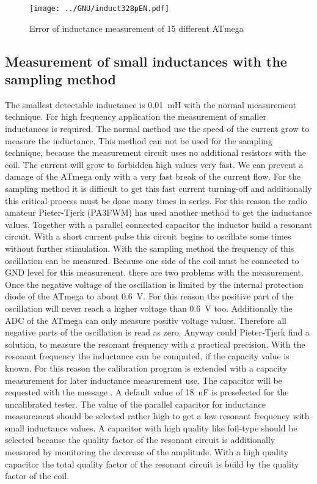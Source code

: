 \begin{figure}[H]
\centering
\texttt{[image: ../GNU/induct328pEN.pdf]}
\caption{Error of inductance measurement of 15 different ATmega}
\label{fig:Induct328p}
\end{figure}

\subsection{Measurement of small inductances with the sampling method}

The smallest detectable inductance is 0.01~mH with the normal measurement technique.
For high frequency application the measurement of smaller inductances is required.
The normal method use the speed of the current grow to measure the inductance.
This method can not be used for the sampling technique, because the measurement circuit
uses no additional resistors with the coil. The current will grow to forbidden high values
very fast. We can prevent a damage of the ATmega only with a very fast break of the current flow.
For the sampling method it is difficult to get this fast current turning-off and
additionally this critical process must be done many times in series.
For this reason the radio amateur Pieter-Tjerk (PA3FWM) has used another method to
get the inductance values.
Together with a parallel connected capacitor the inductor build a resonant circuit.
With a short current pulse this circuit begins to oscillate some times without further stimulation.
With the sampling method the frequency of this oscillation can be measured.
Because one side of the coil must be connected to GND level for this measurenent,
there are two problems with the measurement.
Once the negative voltage of the oscillation is limited by the internal protection diode
of the ATmega to about 0.6~V.  
For this reason the positive part of the oscillation will never reach a higher voltage
than 0.6~V too.
Additionally the ADC of the ATmega can only measure positiv voltage values.
Therefore all negative parts of the oscillation is read as zero.
Anyway could Pieter-Tjerk find a solution, to measure the resonant frequency with
a practical precision.
With the resonant frequency the inductance can be computed, if the capacity value is known.
For this reason the calibration program is extended with a capacity measurement for
later inductance measurement use.
The capacitor will be requested with the message .
A default value of 18~nF is preselected for the uncalibrated tester.
The value of the parallel capacitor for inductance measurement should be selected
rather high to get a low resonant frequency with small inductance values.
A capacitor with high quality like foil-type should be selected because
the quality factor of the resonant circuit is additionally measured by
monitoring the decrease of the amplitude.
With a high quality capacitor the total quality factor of the resonant circuit
is build by the quality factor of the coil.

